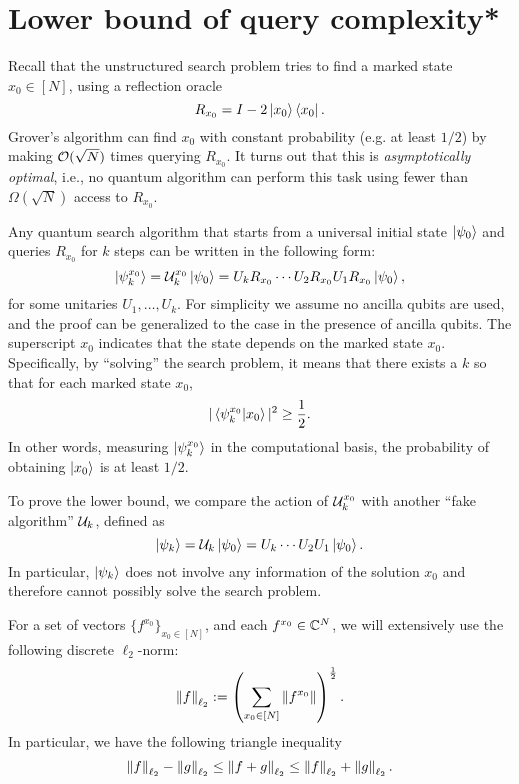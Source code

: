 \section{Lower bound of query complexity*}\label{sec:lowerbound_grover}

Recall that the unstructured search problem tries to find a marked state $x_0\in[N]$, using a reflection oracle
\begin{equation}
R_{x_0}=I-2\ket{x_0}\bra{x_0}.
\end{equation}
Grover's algorithm can find $x_0$ with constant probability (e.g. at least $1/2$) by making $\mathcal{O}(\sqrt{N})$ times querying $R_{x_0}$. 
It turns out that this is \emph{asymptotically optimal}, i.e., no quantum algorithm can perform this task using fewer than $\Omega(\sqrt{N})$ access to $R_{x_0}$.

Any quantum search algorithm that starts from a universal initial state $\ket{\psi_0}$ and queries $R_{x_0}$ for $k$ steps can be written in the following form:
\begin{equation}
\ket{\psi^{x_0}_k}=\mathcal{U}^{x_0}_k\ket{\psi_0}=U_kR_{x_0}\cdots U_2R_{x_0} U_1R_{x_0}\ket{\psi_0},
\end{equation}
for some unitaries $U_1,\ldots,U_k$.
For simplicity we assume no ancilla qubits are used, and the proof can be generalized to the case in the presence of ancilla qubits.
The superscript $x_0$ indicates that the state depends on the marked state $x_0$.
Specifically, by ``solving'' the search problem, it means that there exists a $k$ so that for each marked state $x_0$, 
\begin{equation}\label{eqn:def_grover_success}
|\braket{\psi^{x_0}_k|x_0}|^2\ge \frac12.
\end{equation}
In other words, measuring $\ket{\psi^{x_0}_k}$ in the computational basis, the probability of obtaining $\ket{x_0}$ is at least $1/2$. 

To prove the lower bound, we compare the action of $\mathcal{U}^{x_0}_k$ with another ``fake algorithm'' $\mathcal{U}_k$, defined as
\begin{equation}
\ket{\psi_k}=\mathcal{U}_k\ket{\psi_0}=U_k\cdots U_2 U_1\ket{\psi_0}.
\end{equation}
In particular,  $\ket{\psi_k}$ does not involve any information of the solution $x_0$ and therefore cannot possibly solve the search problem.


For a set of vectors $\{f^{x_0}\}_{x_0\in [N]}$, and each $f^{x_0}\in \mathbb{C}^N$, we will extensively use the following discrete $\ell_2$-norm:
\begin{equation}
\left\lVert f\right\rVert_{\ell_2}:=\left(\sum_{x_0\in[N]} \left\lVert f^{x_0}\right\rVert\right)^{\frac12}.
\end{equation}
In particular, we have the following triangle inequality
\begin{equation}
\left\lVert f\right\rVert_{\ell_2}-\left\lVert g\right\rVert_{\ell_2}\le\left\lVert f+g\right\rVert_{\ell_2}\le\left\lVert f\right\rVert_{\ell_2}+\left\lVert g\right\rVert_{\ell_2}.
\end{equation}

